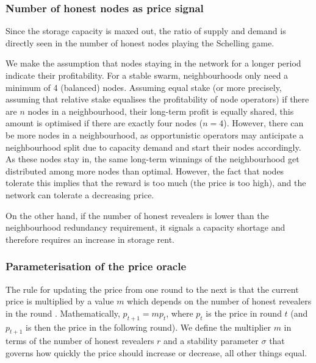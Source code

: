 \subsubsection{Number of honest nodes as price signal}

Since the storage capacity is maxed out, the ratio of supply and demand is directly seen in the number of honest nodes playing the Schelling game. 

We make the assumption that nodes staying in the network for a longer period indicate their profitability. For a stable swarm, neighbourhoods  only need a minimum of 4 (balanced) nodes. Assuming equal stake (or more precisely, assuming that relative stake equalises the profitability of node operators) if there are $n$ nodes in a neighbourhood, their long-term profit is equally shared, this amount is optimised if there are exactly four nodes ($n=4$). However, there can be more nodes in a neighbourhood, as opportunistic operators may anticipate a neighbourhood split due to capacity demand and start their nodes accordingly. As these nodes stay in, the same long-term winnings of the neighbourhood get distributed among more nodes than optimal.
However, the fact that nodes tolerate this implies that the reward is too much (the price is too high), and the network can tolerate a decreasing price.

On the other hand, if the number of honest revealers is lower than the neighbourhood redundancy requirement, it signals a capacity shortage and therefore requires an increase in storage rent. 




\subsubsection{Parameterisation of the price oracle}

The rule for updating the price from one round to the next is that the current price is multiplied by a value $m$ which depends on the number of honest revealers in the round%
. Mathematically, $p_{t+1} = m p_t$, where $p_t$ is the price in round $t$ (and $p_{t+1}$ is then the price in the following round). We define the multiplier $m$ in terms of the number of honest revealers $r$ and a stability parameter $\sigma$ that governs how quickly the price should increase or decrease, all other things equal. 

